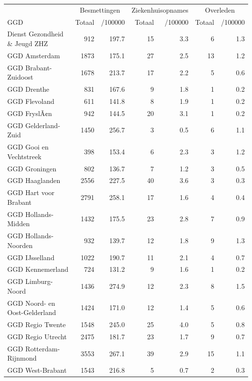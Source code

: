 \documentclass[
  english,
  man,floatsintext]{apa6}
\begin{document}
\begin{table}
\centering\begingroup\fontsize{10}{12}\selectfont

\begin{threeparttable}
\begin{tabular}{lrrrrrr}
\toprule
\multicolumn{1}{c}{ } & \multicolumn{2}{c}{Besmettingen} & \multicolumn{2}{c}{Ziekenhuisopnames} & \multicolumn{2}{c}{Overleden} \\
\cmidrule(l{3pt}r{3pt}){2-3} \cmidrule(l{3pt}r{3pt}){4-5} \cmidrule(l{3pt}r{3pt}){6-7}
GGD & Totaal & /100000 & Totaal & /100000 & Totaal & /100000\\
\midrule
Dienst Gezondheid \& Jeugd ZHZ & 912 & 197.7 & 15 & 3.3 & 6 & 1.3\\
GGD Amsterdam & 1873 & 175.1 & 27 & 2.5 & 13 & 1.2\\
GGD Brabant-Zuidoost & 1678 & 213.7 & 17 & 2.2 & 5 & 0.6\\
GGD Drenthe & 831 & 167.6 & 9 & 1.8 & 1 & 0.2\\
GGD Flevoland & 611 & 141.8 & 8 & 1.9 & 1 & 0.2\\
GGD FryslÃ¢n & 942 & 144.5 & 20 & 3.1 & 1 & 0.2\\
GGD Gelderland-Zuid & 1450 & 256.7 & 3 & 0.5 & 6 & 1.1\\
GGD Gooi en Vechtstreek & 398 & 153.4 & 6 & 2.3 & 3 & 1.2\\
GGD Groningen & 802 & 136.7 & 7 & 1.2 & 3 & 0.5\\
GGD Haaglanden & 2556 & 227.5 & 40 & 3.6 & 3 & 0.3\\
GGD Hart voor Brabant & 2791 & 258.1 & 17 & 1.6 & 4 & 0.4\\
GGD Hollands-Midden & 1432 & 175.5 & 23 & 2.8 & 7 & 0.9\\
GGD Hollands-Noorden & 932 & 139.7 & 12 & 1.8 & 9 & 1.3\\
GGD IJsselland & 1022 & 190.7 & 11 & 2.1 & 4 & 0.7\\
GGD Kennemerland & 724 & 131.2 & 9 & 1.6 & 1 & 0.2\\
GGD Limburg-Noord & 1436 & 274.9 & 12 & 2.3 & 8 & 1.5\\
GGD Noord- en Oost-Gelderland & 1424 & 171.0 & 12 & 1.4 & 5 & 0.6\\
GGD Regio Twente & 1548 & 245.0 & 25 & 4.0 & 5 & 0.8\\
GGD Regio Utrecht & 2475 & 181.7 & 23 & 1.7 & 9 & 0.7\\
GGD Rotterdam-Rijnmond & 3553 & 267.1 & 39 & 2.9 & 15 & 1.1\\
GGD West-Brabant & 1543 & 216.8 & 5 & 0.7 & 2 & 0.3\\

\end{tabular}
\end{threeparttable}
\end{table}
\end{document}

